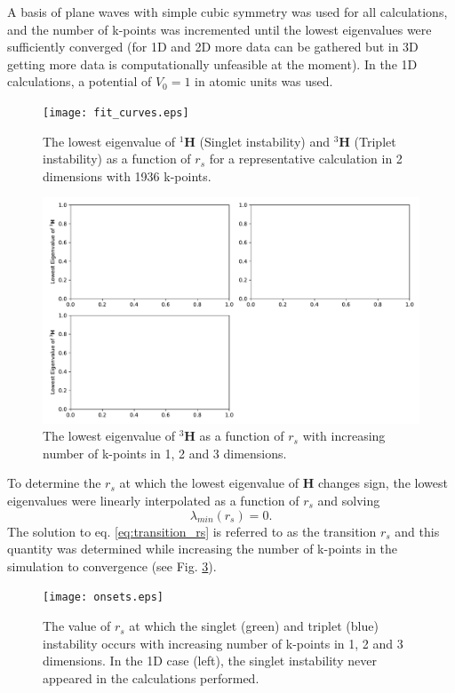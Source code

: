 \documentclass[preprint, journal=prl]{revtex4-1}
\begin{document}
  A basis of plane waves with simple cubic symmetry was used for all calculations, and the number of k-points was incremented until the lowest eigenvalues were sufficiently converged {\color{red} (for 1D and 2D more data can be gathered but in 3D getting more data is computationally unfeasible at the moment)}. In the 1D calculations, a potential of $V_0 = 1$ in atomic units was used.
  \begin{figure}[H]
    \centering
    \texttt{[image: fit\_curves.eps]}
    \caption{The lowest eigenvalue of ${}^1\mathbf{H}$ (Singlet instability) and ${}^3\mathbf{H}$ (Triplet instability) as a function of $r_s$ for a representative calculation in 2 dimensions with 1936 k-points.}
    \label{fig:singlet_convergence}
  \end{figure}
  \begin{figure}[H]
    \centering
    \includegraphics[width=\textwidth]{../../images/triplet-stability-convergence.pdf}
    \caption{The lowest eigenvalue of ${}^3\mathbf{H}$ as a function of $r_s$ with increasing number of k-points in 1, 2 and 3 dimensions.}
    \label{fig:triplet_convergence}
  \end{figure}
  To determine the $r_s$ at which the lowest eigenvalue of $\mathbf{H}$ changes sign, the lowest eigenvalues were linearly interpolated  as a function of $r_s$ and solving
  \begin{equation} \label{eq:transition_rs}
    \lambda_{min}(r_s) = 0.
  \end{equation}
  The solution to eq. \ref{eq:transition_rs} is referred to as the transition $r_s$ and this quantity was determined while increasing the number of k-points in the simulation to convergence (see Fig. \ref{fig:onset}).
  \begin{figure}[H]
    \centering
    \texttt{[image: onsets.eps]}
    \caption{The value of $r_s$ at which the singlet (green) and triplet (blue) instability    occurs with increasing number of k-points in 1, 2 and 3 dimensions. In the 1D case (left), the singlet instability never appeared in the calculations performed. }
    \label{fig:onset}
  \end{figure}
  
\end{document}
